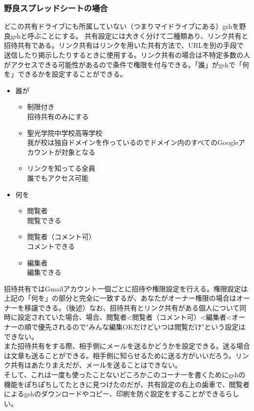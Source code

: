 \documentclass[dvipdfmx,jb5]{jarticle}
\begin{document}
  \subsubsection{野良スプレッドシートの場合}
  どこの共有ドライブにも所属していない（つまりマイドライブにある）gshを野良gshと呼ぶことにする。
 共有設定には大きく分けて二種類あり、リンク共有と招待共有である。リンク共有はリンクを用いた共有方法で、URLを別の手段で送信したり掲示したりするときに使用する。リンク共有の場合は不特定多数の人がアクセスできる可能性があるので条件で権限を付与できる。「誰」がgshで「何を」できるかを設定することができる。
 \begin{itemize}
 \item 誰が
 \begin{itemize}
 \item 制限付き\\
 招待共有のみにする
 \item 聖光学院中学校高等学校\\
 我が校は独自ドメインを作っているのでドメイン内のすべてのGoogleアカウントが対象となる
 \item リンクを知ってる全員\\
 誰でもアクセス可能
 \end{itemize}
 \item 何を
 \begin{itemize}
 \item 閲覧者\\
 閲覧できる
 \item 閲覧者（コメント可）\\
 コメントできる
 \item 編集者\\
 編集できる
 \end{itemize}
 \end{itemize}
 招待共有ではGmailアカウント一個ごとに招待や権限設定を行える。権限設定は上記の「何を」の部分と完全に一致するが、あなたがオーナー権限の場合はオーナーを移譲できる。（後述）なお、招待共有とリンク共有がある個人について同時に設定されていた場合、場合、閲覧者<閲覧者（コメント可）<編集者<オーナーの順で優先されるので"みんな編集OKだけどいつは閲覧だけ"という設定はできない。
 \\
 
 また招待共有をする際、相手側にメールを送るかどうかを設定できる。送る場合は文章も送ることができる。相手側に知らせるために送る方がいいだろう。リンク共有はあたりまえだが、メールを送ることはできない。
 \\
 
 そして、これは一度も使ったことないどころかこのコーナーを書くためにgshの機能をぽちぽちしてたときに見つけたのだが、共有設定の右上の歯車で、閲覧者によるgshのダウンロードやコピー、印刷を防ぐ設定をすることができるらしい。
\end{document}
